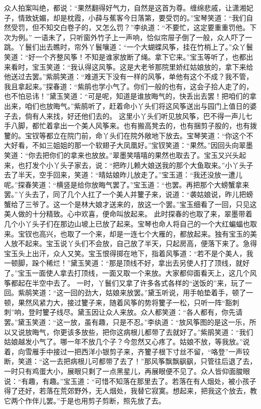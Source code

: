 \documentclass[12pt,oneside]{book}
\begin{document}
众人拍案叫绝，都说：“果然翻得好气力，自然是这首为尊。缠绵悲戚，让潇湘妃子，情致妩媚，却是枕霞，小薛与蕉客今日落第，要受罚的。”宝琴笑道：“我们自然受罚，但不知交白卷子的，又怎么罚？”李纨道：“不要忙，这定要重重罚他。下次为例。”
一语未了，只听窗外竹子上一声响，恰似帘屉子倒了一般，众人吓了一跳。丫鬟们出去瞧时，帘外丫鬟嚷道：“一个大蝴蝶风筝，挂在竹梢上了。”众丫鬟笑道：“好一个齐整风筝！不知是谁家放断了绳。拿下它来。”宝玉等听了，也都出来看时，宝玉笑道：“我认得这风筝。这是大老爷那院里娇红姑娘放的，拿下来给他送过去罢。”紫鹃笑道：“难道天下没有一样的风筝，单他有这个不成？我不管，我且拿起来。”探春道：“紫鹃也学小气了。你们一般的也有，这会子拾人走了的，也不怕忌讳！”黛玉笑道：“可是呢，知道是谁放晦气的，快丢出去罢！把咱们的拿出来，咱们也放晦气。”紫鹃听了，赶着命小丫头们将这风筝送出与园门上值日的婆子去，倘有人来找，好还他们去的。
这里小丫头们听见放风筝，巴不得一声儿七手八脚，都忙着拿出一个美人风筝来。也有搬高凳去的，也有捆剪子股的，也有拨籰的。宝钗等都立在院门前，命丫头们在院外敞地下放去。宝琴笑道：“你这个不大好看，不如三姐姐的那一个软翅子大凤凰好。”宝钗笑道：“果然。”因回头向翠墨笑道：“你去把你们的拿来也放放。”翠墨笑嘻嘻的果然也取去了。宝玉又兴头起来，也打发个小丫头子家去，说：“把昨儿赖大娘送我的那个大鱼取来。”小丫头子去了半天，空手回来，笑道：“晴姑娘昨儿放走了。”宝玉道：“我还没放一遭儿呢。”探春笑道：“横竖是给你放晦气罢了。”宝玉道：“也罢。再把那个大螃蟹拿来罢。”丫头去了，同了几个人扛了一个美人并籰子来，说道：“袭姑娘说，昨儿把螃蟹给了三爷了。这一个是林大娘才送来的，放这一个罢。”宝玉细看了一回，只见这美人做的十分精致。心中欢喜，便命叫放起来。
此时探春的也取了来，翠墨带着几个小丫头子们在那边山坡上已放了起来。宝琴也命人将自己的一个大红蝙蝠也取来。宝钗也高兴，也取了一个来，却是一连七个大雁的，都放起来。独有宝玉的美人放不起来。宝玉说丫头们不会放，自己放了半天，只起房高，便落下来了。急得宝玉头上出汗，众人又笑。宝玉恨得掷在地下，指着风筝道：“若不是个美人，我一顿脚，跺个稀烂！”黛玉笑道：“那是顶线不好，拿出去另使人打了顶线，就好了。”宝玉一面使人拿去打顶线，一面又取一个来放。大家都仰面看天上，这几个风筝都起在半空中去了。
一时，丫鬟们又拿了许多各式各样的“送饭的”来，玩了一回。紫鹃笑道：“这一回的劲大，姑娘来放罢。”黛玉听说，用手帕垫着手，顿了一顿，果然风紧力大，接过籰子来，随着风筝的势将籰子一松，只听一阵“豁刺刺”响，登时籰子线尽。黛玉因让众人来放。众人都笑道：“各人都有，你先请罢。”黛玉笑道：“这一放，虽有趣，只是不忍。”李纨道：“放风筝图的是这一乐，所以又说放晦气，你更该多放些，把你这病根儿都带了去就好了。”紫鹃笑道：“我们姑娘越发小气了。哪一年不放几个子？今忽然又心疼了。姑娘不放，等我放。”说着，向雪雁手中接过一把西洋小银剪子来，齐籰子根下寸丝不留，“咯登”一声铰断，笑道：“这一去把病根儿可都带了去了！”那风筝飘飘飖飖，只管往后退了去，一时只有鸡蛋大小，展眼只剩了一点黑星儿，再展眼便不见了。众人皆仰面脧眼说：“有趣，有趣。”宝玉道：“可惜不知落在那里去了。若落在有人烟处，被小孩子得了还好，若落在荒郊野外，无人烟处，我替它寂寞。想起来，把我这个放去，教它两个作伴儿罢。”于是也用剪子剪断，照先放了去。
\end{document}
